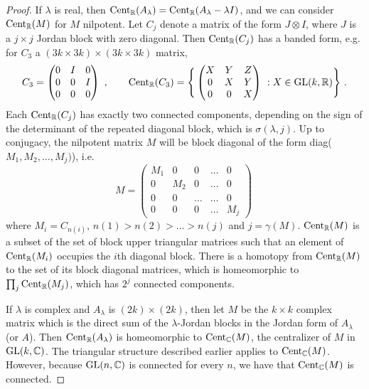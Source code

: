 \documentclass{amsart}
\theoremstyle{definition}
\theoremstyle{remark}
\numberwithin{equation}{section}
\begin{document}
{{\begin{proof}
If $\lambda$ is real, then 
$\textnormal{Cent}_{\mathbb R}(A_{\lambda})=
\textnormal{Cent}_{\mathbb R}(A_{\lambda}-\lambda I)$, 
and we can consider  
$\textnormal{Cent}_{\mathbb R}(M)$ for $M$ nilpotent. 
Let $C_j$ denote a matrix of the form $J\otimes I$, where 
$J$ is a  $j\times j$ Jordan block with zero diagonal. Then 
$\textnormal{Cent}_{\mathbb R}(C_j)$ has a banded form, e.g. 
for $C_3$ a $(3k\times 3k)\times (3k\times 3k)$ matrix,  
\[
C_3= \begin{pmatrix} 0 & I & 0 \\ 0 & 0 & I \\ 0 & 0 & 0 
\end{pmatrix}\ , \qquad 
\textnormal{Cent}_{\mathbb R}(C_3)= \Bigg\{ 
\begin{pmatrix} X & Y & Z \\ 0 & X & Y \\ 0 & 0 & X 
\end{pmatrix}\ : 
X\in \textnormal{GL}(k,\mathbb R)
\Bigg\}\ . 
\] 
Each  $\textnormal{Cent}_{\mathbb R}(C_j)$ has exactly 
two connected components, depending on the sign of 
the determinant of the repeated diagonal block, 
which is $\sigma(\lambda ,j)$. Up to 
conjugacy, the nilpotent matrix $M$ will be block 
diagonal of the form diag($M_1, M_2, \dots , M_j)$), i.e. 
\[ 
M= \begin{pmatrix} 
M_1 & 0   & 0     &  \dots  &  0 \\ 
0   & M_2 & 0     & \dots   & 0 \\ 
0   & 0   & \dots & \dots   & 0 \\ 
0   & 0   & 0     & \dots   & M_j
\end{pmatrix}\ 
\] 
where $M_i=C_{n(i)}$, $n(1)>n(2)> \dots > n(j)$ and 
$j=\gamma (M)$. 
$\textnormal{Cent}_{\mathbb R}(M)$ is a 
subset of the set of block upper triangular 
matrices such that an element of 
$\textnormal{Cent}_{\mathbb R}(M_i)$ 
occupies  the $i$th diagonal 
block. There is a homotopy from 
$\textnormal{Cent}_{\mathbb R}(M)$ to the set of its 
block diagonal matrices, which is homeomorphic to 
$\prod_j\textnormal{Cent}_{\mathbb R}(M_j)$, which 
has $2^j$ connected components. 

If $\lambda$ is complex and $A_{\lambda}$ is $(2k)\times (2k)$,
 then let $M$ be the $k\times k$ complex matrix 
which is the direct sum of the $\lambda$-Jordan blocks 
in the Jordan form of $A_{\lambda}$ (or $A$). Then 
$\textnormal{Cent}_{\mathbb R}(A_{\lambda})$ is homeomorphic to 
$\textnormal{Cent}_{\mathbb C}(M)$, 
the centralizer of $M$ in $\textnormal{GL}(k , \mathbb C)$. 
 The triangular structure 
described earlier applies to $\textnormal{Cent}_{\mathbb C}(M)$.
However, because $\textnormal{GL}(n,\mathbb C)$ is connected for every $n$, 
we have that $\textnormal{Cent}_{\mathbb C}(M)$ is connected. 
\end{proof} 

}}
\end{document}
